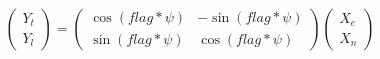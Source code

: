\[
\left( \begin{array}{c} Y_t \\ Y_l \end{array} \right)
  = 
  \left( \begin{array}{cc} \cos(flag*\psi) & -\sin(flag*\psi) \\ \sin(flag*\psi)
  & \cos(flag*\psi) \end{array} \right)
  \left( \begin{array}{c} X_e \\ X_n \end{array} \right)
\]

